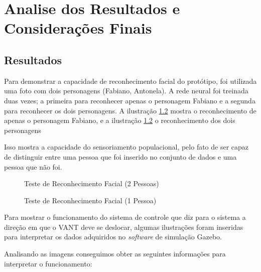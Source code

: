 \chapter{Analise dos Resultados e Considerações Finais}\label{cap:apresAnaRes}

\section{Resultados}

Para demonstrar a capacidade de reconhecimento facial do protótipo, foi utilizada uma foto com dois personagens (Fabiano, Antonela). A rede neural foi treinada duas vezes; a primeira para reconhecer apenas o personagem Fabiano e a segunda para reconhecer os dois personagens. 
A ilustração \ref{fig:eu2} mostra o reconhecimento de apenas o personagem Fabiano, e a ilustração \ref{fig:eu2} o reconhecimento dos dois personagens     
 
Isso mostra a capacidade do sensoriamento populacional, pelo fato de ser capaz de distinguir entre uma pessoa que foi inserido no conjunto de dados e uma pessoa que não foi.  
 
\begin{figure}[H]
	\centering	
	\caption{Teste de Reconhecimento Facial (2 Pessoas)}
	\def\svgwidth{8cm}
	
	\label{fig:eu}
\end{figure} 
 
\begin{figure}[H]
	\centering	
	\caption{Teste de Reconhecimento Facial (1 Pessoa)}
	\def\svgwidth{8cm}
	
	\label{fig:eu2}
\end{figure} 
 
Para mostrar o funcionamento do sistema de controle que diz para o sistema a direção em que o VANT deve se deslocar, algumas ilustrações foram inseridas para interpretar os dados adquiridos no \textit{software } de simulação Gazebo.

Analisando as imagens conseguimos obter as seguintes informações para interpretar o funcionamento:  

